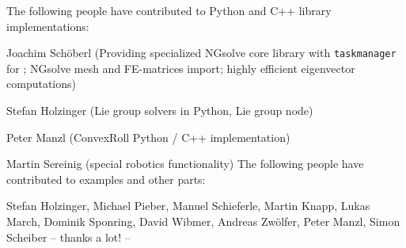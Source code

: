 The following people have contributed to Python and C++ library implementations:
\bi
  \item Joachim Sch{\"o}berl (Providing specialized NGsolve core library with \texttt{taskmanager} for ; NGsolve mesh and FE-matrices import; highly efficient eigenvector computations)
  \item Stefan Holzinger (Lie group solvers in Python, Lie group node)
  \item Peter Manzl (ConvexRoll Python / C++ implementation)
  \item Martin Sereinig (special robotics functionality)
\ei
The following people have contributed to examples and other parts:
\bi
  \item Stefan Holzinger, Michael Pieber, Manuel Schieferle, Martin Knapp, Lukas March, Dominik Sponring, David Wibmer, Andreas Zw{\"o}lfer, Peter Manzl, Simon Scheiber
\ei
-- thanks a lot! --
%
\newpage
{}
\label{sec:installationInstructions}
%

